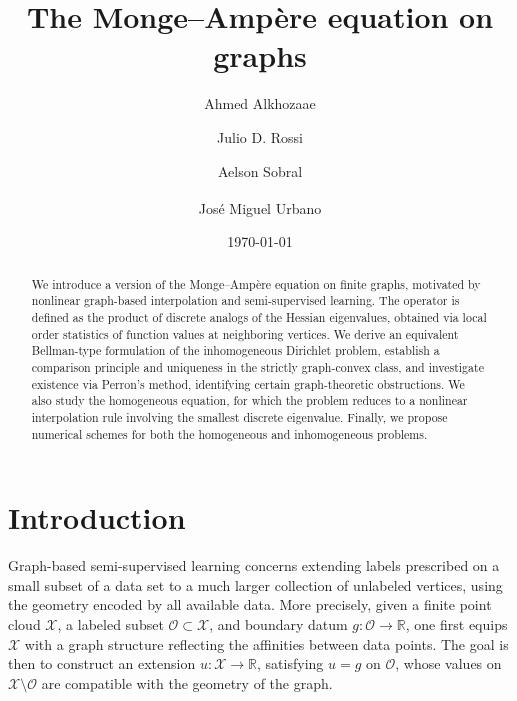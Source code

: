 \documentclass[reqno,11pt]{amsart}
\title{The Monge--Amp\`ere equation on graphs}
\author[A. Alkhozaae]{Ahmed Alkhozaae}
\author[J.D. Rossi]{Julio D. Rossi}
\author[A. Sobral]{Aelson Sobral}
\author[J.M. Urbano]{Jos\'{e} Miguel Urbano\textsuperscript{\dag}}
\numberwithin{equation}{section}
\theoremstyle{definition}
\theoremstyle{remark}
\begin{document}



  
\begin{abstract}
We introduce a version of the Monge--Amp\`ere equation on finite graphs, motivated by nonlinear graph-based interpolation and semi-supervised learning. The operator is defined as the product of discrete analogs of the Hessian eigenvalues, obtained via local order statistics of function values at neighboring vertices. We derive an equivalent Bellman-type formulation of the inhomogeneous Dirichlet problem, establish a comparison principle and uniqueness in the strictly graph-convex class, and investigate existence via Perron's method, identifying certain graph-theoretic obstructions. We also study the homogeneous equation, for which the problem reduces to a nonlinear interpolation rule involving the smallest discrete eigenvalue. Finally, we propose numerical schemes for both the homogeneous and inhomogeneous problems.
\end{abstract}
 
\date{\today}

\maketitle
 
\tableofcontents 

\section{Introduction}\label{sct:intro}

Graph-based semi-supervised learning concerns extending labels prescri\-bed on a small subset of a data set to a much larger collection of unlabeled vertices, using the geometry encoded by all available data. More precisely, given a finite point cloud \(\mathcal X\), a labeled subset \(\mathcal O \subset \mathcal X\), and boundary datum \(g \colon \mathcal O \to \mathbb R\), one first equips \(\mathcal X\) with a graph structure reflecting the affinities between data points. The goal is then to construct an extension \(u \colon \mathcal X \to \mathbb R\), satisfying \(u=g\) on \(\mathcal O\), whose values on \(\mathcal X \setminus \mathcal O\) are compatible with the geometry of the graph.
\end{document}
